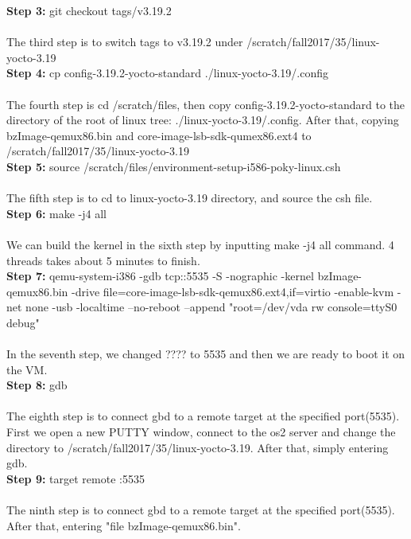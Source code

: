 \documentclass[10pt,letterpaper]{article}
\begin{document}
\textbf{Step 3:}
git checkout tags/v3.19.2\\ \\
The third step is to switch tags to v3.19.2 under /scratch/fall2017/35/linux-yocto-3.19 \\

\textbf{Step 4:}
cp config-3.19.2-yocto-standard ./linux-yocto-3.19/.config\\ \\
The fourth step is cd /scratch/files, then copy config-3.19.2-yocto-standard to the directory of the root of linux tree: ./linux-yocto-3.19/.config. After that,  copying bzImage-qemux86.bin and core-image-lsb-sdk-qumex86.ext4 to /scratch/fall2017/35/linux-yocto-3.19 \\

\textbf{Step 5:}
source /scratch/files/environment-setup-i586-poky-linux.csh\\ \\
The fifth step is to cd to linux-yocto-3.19 directory, and source the csh file. \\

\textbf{Step 6:}
make -j4 all\\ \\
We can build the kernel in the sixth step by inputting make -j4 all command. 4 threads takes about 5 minutes to finish. \\

\textbf{Step 7:}
qemu-system-i386 -gdb tcp::5535 -S -nographic -kernel bzImage-qemux86.bin -drive file=core-image-lsb-sdk-qemux86.ext4,if=virtio -enable-kvm -net none -usb -localtime --no-reboot --append "root=/dev/vda rw console=ttyS0 debug"\\ \\
In the seventh step, we changed ???? to 5535 and then we are ready to boot it on the VM. \\

\textbf{Step 8:}
gdb\\ \\
The eighth step is to connect gbd to a remote target at the specified port(5535). First we open a new PUTTY window, connect to the os2 server and change the directory to /scratch/fall2017/35/linux-yocto-3.19. After that, simply entering gdb.\\

\textbf{Step 9:}
target remote :5535\\ \\
The ninth step is to connect gbd to a remote target at the specified port(5535).  After that, entering "file bzImage-qemux86.bin".\\
\end{document}
